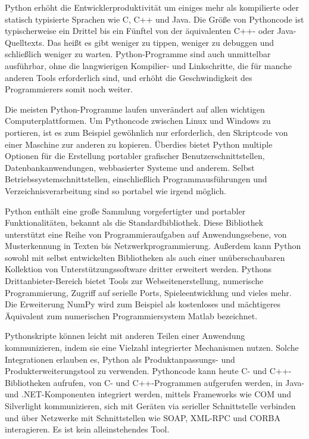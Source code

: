 Python erhöht die Entwicklerproduktivität um einiges mehr als kompilierte oder statisch typisierte Sprachen wie C, C++ und Java. Die Größe von Pythoncode ist typischerweise ein Drittel bis ein Fünftel von der äquivalenten C++- oder Java-Quelltexts. Das heißt es gibt weniger zu tippen, weniger zu debuggen und schließlich weniger zu warten. Python-Programme sind auch unmittelbar ausführbar, ohne die langwierigen Kompilier- und Linkschritte, die für manche anderen Tools erforderlich sind, und erhöht die Geschwindigkeit des Programmierers somit noch weiter.

Die meisten Python-Programme laufen unverändert auf allen wichtigen Computerplattformen. Um Pythoncode zwischen Linux und Windows zu portieren, ist es zum Beispiel gewöhnlich nur erforderlich, den Skriptcode von einer Maschine zur anderen zu kopieren. Überdies bietet Python multiple Optionen für die Erstellung portabler grafischer Benutzerschnittstellen, Datenbankanwendungen, webbasierter Systeme und anderem. Selbst Betriebssystemschnittstellen, einschließlich Programmausführungen und Verzeichnisverarbeitung sind so portabel wie irgend möglich.

Python enthält eine große Sammlung vorgefertigter und portabler Funktionalitäten, bekannt als die Standardbibliothek. Diese Bibliothek unterstützt eine Reihe von Programmieraufgaben auf Anwendungsebene, von Musterkennung in Texten bis Netzwerkprogrammierung. Außerdem kann Python sowohl mit selbst entwickelten Bibliotheken als auch einer unüberschaubaren Kollektion von Unterstützungssoftware dritter erweitert werden. Pythons Drittanbieter-Bereich bietet Tools zur Webseitenerstellung, numerische Programmierung, Zugriff auf serielle Ports, Spieleentwicklung und vieles mehr. Die Erweiterung NumPy wird zum Beispiel als kostenloses und mächtigeres Äquivalent zum numerischen Programmiersystem Matlab bezeichnet.

Pythonskripte können leicht mit anderen Teilen einer Anwendung kommunizieren, indem sie eine Vielzahl integrierter Mechanismen nutzen. Solche Integrationen erlauben es, Python als Produktanpassungs- und Produkterweiterungstool zu verwenden. Pythoncode kann heute C- und C++-Bibliotheken aufrufen, von C- und C++-Programmen aufgerufen werden, in Java- und .NET-Komponenten integriert werden, mittels Frameworks wie COM und Silverlight kommunizieren, sich mit Geräten via serieller Schnittstelle verbinden und über Netzwerke mit Schnittstellen wie SOAP, XML-RPC und CORBA interagieren. Es ist kein alleinstehendes Tool. \cite{lutz2013python}

